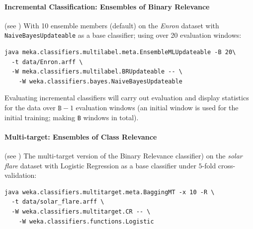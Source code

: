 \documentclass[11pt]{article}
\newcommand{\MEKA}{Meka}
\newcommand{\MOA}{Moa}
\begin{document}


\paragraph{Incremental Classification: Ensembles of Binary Relevance} (see \cite{ECC2,MEDS2}) With 10 ensemble members (default) on the \textit{Enron} dataset with \texttt{NaiveBayesUpdateable} as a base classifier; using over 20 evaluation windows:

\begin{lstlisting}
java meka.classifiers.multilabel.meta.EnsembleMLUpdateable -B 20\
  -t data/Enron.arff \
  -W meka.classifiers.multilabel.BRUpdateable -- \
    -W weka.classifiers.bayes.NaiveBayesUpdateable
\end{lstlisting}

Evaluating incremental classifiers will carry out evaluation and display statistics for the data over $\texttt{B}-1$ evaluation windows (an initial window is used for the initial training; making \texttt{B} windows in total). %

\paragraph{Multi-target: Ensembles of Class Relevance} (see \cite{UPM}) The multi-target version of the Binary Relevance classifier) on the \textit{solar flare} dataset with Logistic Regression as a base classifier under $5$-fold cross-validation:
\begin{lstlisting}
java weka.classifiers.multitarget.meta.BaggingMT -x 10 -R \
  -t data/solar_flare.arff \
  -W weka.classifiers.multitarget.CR -- \
    -W weka.classifiers.functions.Logistic
\end{lstlisting}
\end{document}
